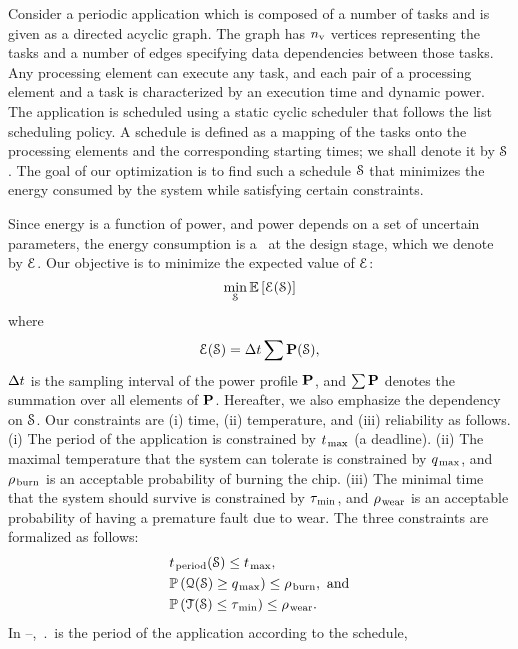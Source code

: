 Consider a periodic application which is composed of a number of tasks and is given as a directed acyclic graph.
The graph has ${n_\text{v}}$ vertices representing the tasks and a number of edges specifying data dependencies between those tasks.
Any processing element can execute any task, and each pair of a processing element and a task is characterized by an execution time and dynamic power.
The application is scheduled using a static cyclic scheduler that follows the list scheduling policy.
A schedule is defined as a mapping of the tasks onto the processing elements and the corresponding starting times; we shall denote it by $\EuScript{S}$.
The goal of our optimization is to find such a schedule $\EuScript{S}$ that minimizes the energy consumed by the system while satisfying certain constraints.

Since energy is a function of power, and power depends on a set of uncertain parameters, the energy consumption is a \rv\ at the design stage, which we denote by $\EuScript{E}$.
Our objective is to minimize the expected value of $\EuScript{E}$:
\begin{equation} \elab{objective}
  \min_{\schedule} \expectation{\qoiE(\schedule)}
\end{equation}
where
\[
  \EuScript{E}(\EuScript{S}) = \Delta t \sum \mathbf{P}(\EuScript{S}),
\]
$\Delta t$ is the sampling interval of the power profile $\mathbf{P}$, and $\sum \mathbf{P}$ denotes the summation over all elements of $\mathbf{P}$.
Hereafter, we also emphasize the dependency on $\EuScript{S}$.
Our constraints are (i) time, (ii) temperature, and (iii) reliability as follows.
(i) The period of the application is constrained by $t_{\text{\kern0.1emmax}}$ (a deadline).
(ii) The maximal temperature that the system can tolerate is constrained by $q_{\text{\kern0.1emmax}}$, and $\rho_{\text{\kern0.1emburn}}$ is an acceptable probability of burning the chip.
(iii) The minimal time that the system should survive is constrained by $\tau_{\text{\kern0.1emmin}}$, and $\rho_{\text{\kern0.1emwear}}$ is an acceptable probability of having a premature fault due to wear.
The three constraints are formalized as follows:
\begin{align}
  & \period(\schedule) \leq \t_\maximal, \elab{timing-constraint} \\
  & \probabilityMeasure\left( \qoiQ(\schedule) \geq \q_\maximal \right) \leq \pr_\burn, \text{ and} \elab{thermal-constraint} \\
  & \probabilityMeasure\left( \qoiT(\schedule) \leq \T_\minimal \right) \leq \pr_\wear. \elab{reliability-constraint}
\end{align}
In --, $\period$ is the period of the application according to the schedule,
